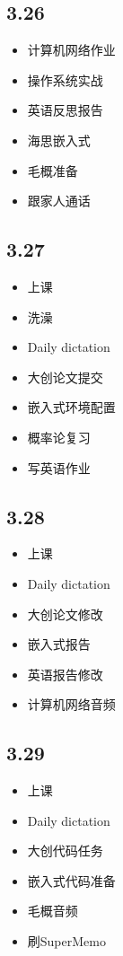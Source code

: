 \documentclass[UTF8]{ctexart}
\begin{document}
\subsection*{3.26}
\begin{itemize}
    \item 计算机网络作业
    \item 操作系统实战
    \item 英语反思报告
    \item 海思嵌入式
    \item 毛概准备
    \item 跟家人通话
\end{itemize}
\subsection*{3.27}
\begin{itemize}
    \item 上课
    \item 洗澡
    \item Daily dictation
    \item 大创论文提交
    \item 嵌入式环境配置
    \item 概率论复习
    \item 写英语作业
\end{itemize}
\subsection*{3.28}
\begin{itemize}
    \item 上课
    \item Daily dictation
    \item 大创论文修改
    \item 嵌入式报告
    \item 英语报告修改
    \item 计算机网络音频
\end{itemize}
\subsection*{3.29}
\begin{itemize}
    \item 上课
    \item Daily dictation
    \item 大创代码任务
    \item 嵌入式代码准备
    \item 毛概音频
    \item 刷SuperMemo
\end{itemize}
\end{document}
